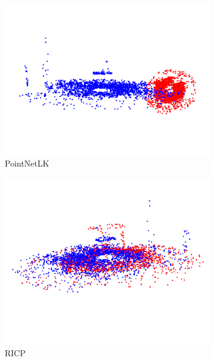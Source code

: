 \documentclass[12pt,titlepage, twoside]{article}
\begin{document}
\begin{figure}[htb]
\begin{subfigure}{0.19\textwidth}
  \includegraphics[width=\linewidth]{./Images/registration_pointnetlk_banana.png}
  \caption{PointNetLK}
  \label{fig:registration:compare:8}
\end{subfigure}\hfil 
\begin{subfigure}{0.19\textwidth}
    \includegraphics[width=\linewidth]{./Images/registration_ricp_banana.png}
    \caption{RICP}
    \label{fig:registration:compare:9}
\end{subfigure}\hfil 
\begin{subfigure}{0.19\textwidth}

\end{subfigure}
\end{figure}
\end{document}

